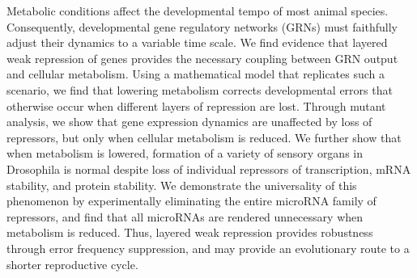 Metabolic conditions affect the developmental tempo of most animal species. Consequently, developmental gene regulatory networks (GRNs) must faithfully adjust their dynamics to a variable time scale. We find evidence that layered weak repression of genes provides the necessary coupling between GRN output and cellular metabolism. Using a mathematical model that replicates such a scenario, we find that lowering metabolism corrects developmental errors that otherwise occur when different layers of repression are lost. Through mutant analysis, we show that gene expression dynamics are unaffected by loss of repressors, but only when cellular metabolism is reduced. We further show that when metabolism is lowered, formation of a variety of sensory organs in Drosophila is normal despite loss of individual repressors of transcription, mRNA stability, and protein stability. We demonstrate the universality of this phenomenon by experimentally eliminating the entire microRNA family of repressors, and find that all microRNAs are rendered unnecessary when metabolism is reduced. Thus, layered weak repression provides robustness through error frequency suppression, and may provide an evolutionary route to a shorter reproductive cycle.
